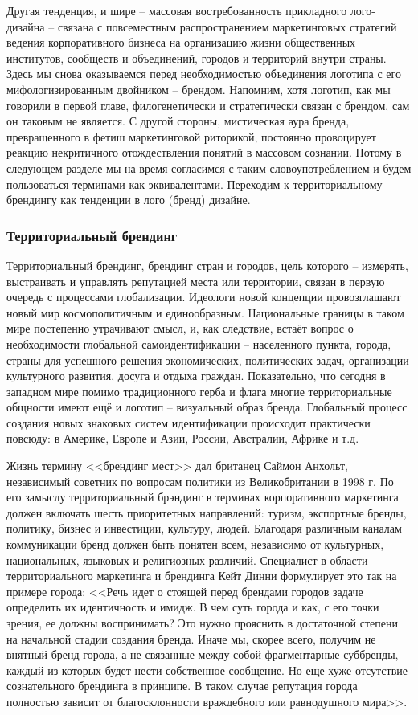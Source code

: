 Другая тенденция, и шире -- массовая  востребованность  прикладного лого-дизайна -- связана с
повсеместным распространением  маркетинговых стратегий ведения корпоративного бизнеса на организацию
жизни общественных институтов, сообществ и объединений, городов и территорий внутри страны. Здесь мы
снова оказываемся перед необходимостью объединения логотипа с его мифологизированным двойником --
брендом. Напомним, хотя логотип, как мы говорили в первой главе, филогенетически и стратегически
связан с брендом, сам он таковым не является. С другой стороны, мистическая аура бренда,
превращенного в фетиш маркетинговой риторикой, постоянно провоцирует реакцию некритичного
отождествления понятий в массовом сознании. Потому в следующем разделе мы на время согласимся с
таким словоупотреблением и будем пользоваться терминами как эквивалентами. Переходим к
территориальному брендингу как тенденции в лого (бренд) дизайне.

\subsubsection{Территориальный брендинг}

Территориальный брендинг, брендинг стран и городов, цель которого -- измерять, выстраивать и
управлять репутацией места или территории, связан в первую очередь с процессами
глобализации. Идеологи новой концепции провозглашают  новый мир  космополитичным и единообразным.
Национальные границы в таком мире постепенно утрачивают смысл, и, как следствие, встаёт вопрос о
необходимости глобальной самоидентификации --  населенного пункта, города, страны  для успешного
решения экономических, политических задач, организации культурного развития, досуга и отдыха
граждан. Показательно, что сегодня в западном мире помимо традиционного герба и флага многие
территориальные общности имеют ещё и логотип -- визуальный образ бренда. Глобальный процесс создания
новых знаковых систем идентификации происходит практически повсюду: в Америке, Европе и Азии,
России, Австралии, Африке и т.д.

Жизнь термину <<брендинг мест>> дал британец Саймон Анхольт, независимый советник по вопросам
политики из Великобритании в 1998 г. По его замыслу территориальный брэндинг в терминах
корпоративного маркетинга должен включать шесть приоритетных направлений: туризм, экспортные бренды,
политику, бизнес и инвестиции, культуру, людей. Благодаря различным каналам коммуникации бренд
должен быть понятен всем, независимо от культурных, национальных, языковых и религиозных
различий. Специалист в области территориального маркетинга и брендинга Кейт Динни формулирует это
так на примере города: <<Речь идет о стоящей перед брендами городов задаче определить их идентичность
и имидж. В чем суть города и как, с его точки зрения, ее должны воспринимать? Это нужно прояснить в
достаточной степени на начальной стадии создания бренда. Иначе мы, скорее всего, получим не внятный
бренд города, а не связанные между собой фрагментарные суббренды, каждый из которых будет нести
собственное сообщение. Но еще хуже отсутствие сознательного брендинга в принципе. В таком случае
репутация города полностью зависит от благосклонности враждебного или равнодушного
мира>>. \autocite[][127-128]{book:dinni}

